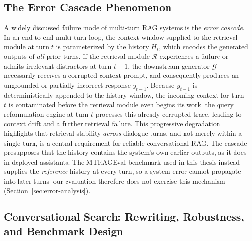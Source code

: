 \subsection{The Error Cascade Phenomenon}

A widely discussed failure mode of multi-turn RAG systems is the \textit{error cascade}. In an end-to-end multi-turn loop, the context window supplied to the retrieval module at turn $t$ is parameterized by the history $H_t$, which encodes the generated outputs of \textit{all} prior turns. If the retrieval module $\mathcal{R}$ experiences a failure or admits irrelevant distractors at turn $t{-}1$, the downstream generator $\mathcal{G}$ necessarily receives a corrupted context prompt, and consequently produces an ungrounded or partially incorrect response $y_{t-1}$. Because $y_{t-1}$ is deterministically appended to the history window, the incoming context for turn $t$ is contaminated before the retrieval module even begins its work: the query reformulation engine at turn $t$ processes this already-corrupted trace, leading to context drift and a further retrieval failure. This progressive degradation highlights that retrieval stability \textit{across} dialogue turns, and not merely within a single turn, is a central requirement for reliable conversational RAG. The cascade presupposes that the history contains the system's own earlier outputs, as it does in deployed assistants. The MTRAGEval benchmark used in this thesis instead supplies the \emph{reference} history at every turn, so a system error cannot propagate into later turns; our evaluation therefore does not exercise this mechanism (Section~\ref{sec:error-analysis}).

\subsection{Conversational Search: Rewriting, Robustness, and Benchmark Design}

